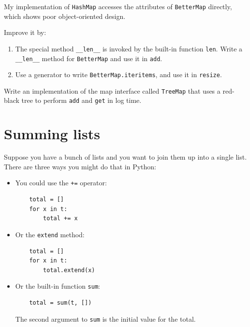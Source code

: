 \documentclass[10pt]{book}
\begin{document}
\begin{exercise}

My implementation of {\tt HashMap} accesses the attributes of
{\tt BetterMap} directly, which shows poor object-oriented design.

Improve it by:

\begin{enumerate}

\item The special method \verb"__len__" is invoked by the built-in
function {\tt len}.  Write a \verb"__len__" method for {\tt BetterMap}
and use it in {\tt add}.

\item Use a generator to write {\tt BetterMap.iteritems}, and use it
in {\tt resize}.

\end{enumerate}

\end{exercise}


\begin{exercise}

Write an implementation of the map interface called
{\tt TreeMap} that uses a red-black tree to perform {\tt add}
and {\tt get} in log time.

\end{exercise}



\section{Summing lists}
\label{growth_experiment}

Suppose you have a bunch of lists and you want to join them up
into a single list.  There are three ways you might do that
in Python:

\begin{itemize}

\item You could use the {\tt +=} operator:

\begin{verbatim}
    total = []
    for x in t:
        total += x
\end{verbatim}

\item Or the {\tt extend} method:

\begin{verbatim}
    total = []
    for x in t:
        total.extend(x)
\end{verbatim}

\item Or the built-in function {\tt sum}:

\begin{verbatim}
    total = sum(t, [])
\end{verbatim}

The second argument to {\tt sum} is the initial value for the total.

\end{itemize}
\end{document}
